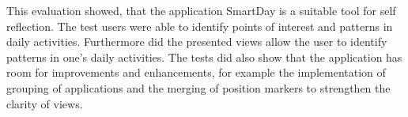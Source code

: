This evaluation showed, that the application SmartDay is a suitable tool for self reflection. The test users were able to identify points of interest and patterns in daily activities. Furthermore did the presented views allow the user to identify patterns in one's daily activities. The tests did also show that the application has room for improvements and enhancements, for example the implementation of grouping of applications and the merging of position markers to strengthen the clarity of views.
